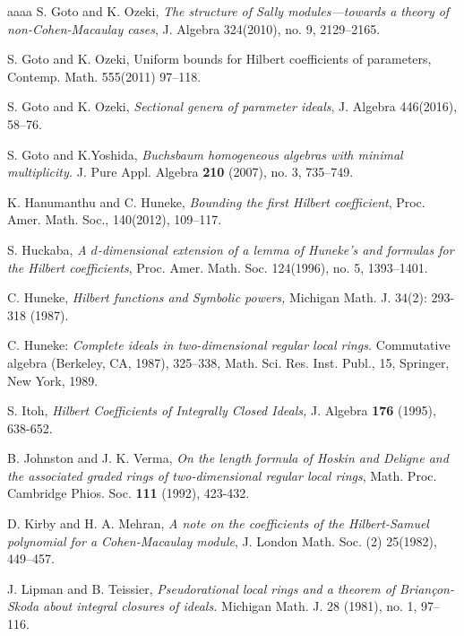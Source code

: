 \documentclass[reqno,a4paper,dvipsnames]{amsart}
\theoremstyle{definition}
\begin{document}
\begin{thebibliography}{aaaa}
 S. Goto and K. Ozeki, \textit{The structure of Sally modules—towards a theory of non-Cohen-Macaulay cases}, J. Algebra 324(2010), no. 9, 2129–2165.

 S. Goto and K. Ozeki, Uniform bounds for Hilbert coefficients of parameters, Contemp. Math. 555(2011) 97–118.

 S. Goto and K. Ozeki, \textit{Sectional genera of parameter ideals}, J. Algebra 446(2016), 58–76.

S. Goto and  K.Yoshida, 
\textit{Buchsbaum homogeneous algebras with minimal multiplicity.}
J. Pure Appl. Algebra {\bf 210} (2007), no. 3, 735–749.

 K. Hanumanthu and C. Huneke, \textit{Bounding the first Hilbert coefficient}, Proc. Amer. Math. Soc., 140(2012), 109–117.

 S. Huckaba, \textit{A $d$-dimensional extension of a lemma of Huneke's and formulas for the Hilbert coefficients}, Proc. Amer. Math. Soc. 124(1996), no. 5, 1393–1401.



 C. Huneke, \textit{Hilbert functions and Symbolic powers,} Michigan Math. J. 34(2): 293-318 (1987).

  C. Huneke: {\em  Complete ideals in
   two-dimensional regular local rings.} Commutative algebra (Berkeley,
   CA, 1987), 325--338, Math. Sci. Res. Inst. Publ., 15, Springer, New
   York, 1989. 
   
 S. Itoh, \textit{Hilbert Coefficients of Integrally Closed Ideals,} J. Algebra {\bf 176} (1995), 638-652.

B. Johnston and J. K. Verma, \textit{On the length formula of Hoskin and Deligne and
the associated graded rings of two-dimensional regular local rings}, Math. Proc. Cambridge
Phios. Soc. {\bf 111} (1992), 423-432.

  D. Kirby and H. A. Mehran, \textit{A note on the coefficients of the Hilbert-Samuel polynomial for a Cohen-Macaulay module}, J. London Math. Soc. (2) 25(1982), 449–457.


J. Lipman and B. Teissier,
\textit{Pseudorational local rings and a theorem of Brian\c{c}on-Skoda about integral closures of ideals.}
Michigan Math. J. 28 (1981), no. 1, 97–116.


\end{thebibliography}
\end{document}
